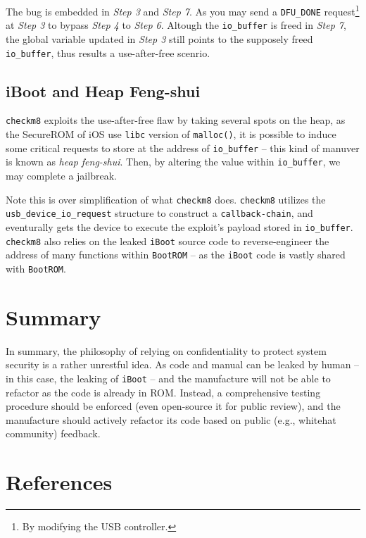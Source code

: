 \documentclass[10pt]{article}
\newcommand{\inlinecode}{\texttt}
\begin{document}
The bug is embedded in \textit{Step 3} and \textit{Step 7}. As you may send a \inlinecode{DFU\_DONE} request\footnote{By modifying the USB controller.} at \textit{Step 3} to bypass \textit{Step 4} to \textit{Step 6}. Altough the \inlinecode{io\_buffer} is freed in \textit{Step 7}, the global variable updated in \textit{Step 3} still points to the supposely freed \inlinecode{io\_buffer}, thus results a use-after-free scenrio.

\subsection{iBoot and Heap Feng-shui}
\inlinecode{checkm8} exploits the use-after-free flaw by taking several spots on the heap, as the SecureROM of iOS use \inlinecode{libc} version of \inlinecode{malloc()}, it is possible to induce some critical requests to store at the address of \inlinecode{io\_buffer} -- this kind of manuver is known as \textit{heap feng-shui}. Then, by altering the value within \inlinecode{io\_buffer}, we may complete a jailbreak.

Note this is over simplification of what \inlinecode{checkm8} does. \inlinecode{checkm8} utilizes the    \inlinecode{usb\_device\_io\_request} structure to construct a \inlinecode{callback-chain}, and eventurally gets the device to execute the exploit's payload stored in \inlinecode{io\_buffer}. \inlinecode{checkm8} also relies on the leaked \inlinecode{iBoot} source code to reverse-engineer the address of many functions within \inlinecode{BootROM} -- as the \inlinecode{iBoot} code is vastly shared with \inlinecode{BootROM}.


\section{Summary}
In summary, the philosophy of relying on confidentiality to protect system security is a rather unrestful idea. As code and manual can be leaked by human -- in this case, the leaking of \inlinecode{iBoot} -- and the manufacture will not be able to refactor as the code is already in ROM. Instead, a comprehensive testing procedure should be enforced (even open-source it for public review), and the manufacture should actively refactor its code based on public (e.g., whitehat community) feedback.


\newpage
\section{References}

\nocite{*}
\raggedright


\end{document}

